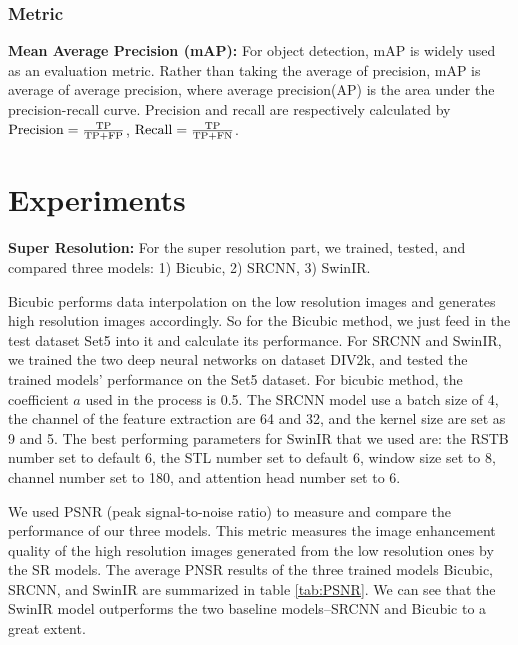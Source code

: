 \documentclass[10pt,twocolumn,letterpaper]{article}
\begin{document}
\subsubsection{Metric}
{\bf Mean Average Precision (mAP): }  For object detection, mAP is widely used as an evaluation metric. Rather than taking the average of precision, mAP is average of average precision, where average precision(AP) is the area under the precision-recall curve. Precision and recall are respectively calculated by $\rm{Precision} = \frac{TP}{TP + FP}$, $\rm{Recall} = \frac{TP}{TP + FN}$.

\section{Experiments}
{\bf Super Resolution:} For the super resolution part, we trained, tested, and compared three models: 1) Bicubic, 2) SRCNN, 3) SwinIR. 

Bicubic performs data interpolation on the low resolution images and generates high resolution images accordingly. So for the Bicubic method, we just feed in the test dataset Set5 into it and calculate its performance. For SRCNN and SwinIR, we trained the two deep neural networks on dataset DIV2k, and tested the trained models' performance on the Set5 dataset. For bicubic method, the coefficient $a$ used in the process is 0.5. The SRCNN model use a batch size of 4, the channel of the feature extraction are 64 and 32, and the kernel size are set as 9 and 5. The best performing parameters for SwinIR that we used are: the RSTB number set to default 6, the STL number set to default 6, window size set to 8, channel number set to 180, and attention head number set to 6. 

We used PSNR (peak signal-to-noise ratio) to measure and compare the performance of our three models. This metric measures the image enhancement quality of the high resolution images generated from the low resolution ones by the SR models. The average PNSR results of the three trained models Bicubic, SRCNN, and SwinIR are summarized in table \ref{tab:PSNR}. We can see that the SwinIR model outperforms the two baseline models--SRCNN and Bicubic to a great extent.

\begin{table}[htbp!]
\centering
\begin{minipage}[htbp!]{0.5\textwidth}
\centering
{}
\end{minipage}
\caption{Average PSNR of Different Super Resolution Technique}
\label{tab:PSNR}
\end{table}
\end{document}
